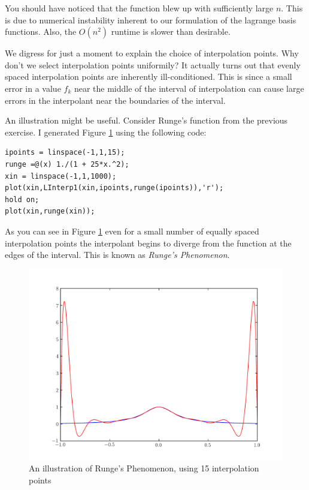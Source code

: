 You should have noticed that the function blew up with sufficiently large $n$. This is due to numerical instability inherent to our formulation of the lagrange basis functions. Also, the $O(n^2)$ runtime is slower than desirable.

We digress for just a moment to explain the choice of interpolation points. Why don't we select interpolation points uniformily? It actually turns out that evenly spaced interpolation points are inherently ill-conditioned. This is since a small error in a value $f_k$ near the middle of the interval of interpolation can cause large errors in the interpolant near the boundaries of the interval.

An illustration might be useful. Consider Runge's function from the previous exercise. I generated Figure \ref{Fig:Runge} using the following code:

\begin{verbatim}
ipoints = linspace(-1,1,15);
runge =@(x) 1./(1 + 25*x.^2);
xin = linspace(-1,1,1000);
plot(xin,LInterp1(xin,ipoints,runge(ipoints)),'r');
hold on;
plot(xin,runge(xin));
\end{verbatim}

As you can see in Figure \ref{Fig:Runge} even for a small number of equally spaced interpolation points the interpolant begins to diverge from the function at the edges of the interval. This is known as \emph{Runge's Phenomenon}.

\begin{figure}
\begin{center}
\includegraphics[scale = .5]{./Figures/Runge.pdf}
\caption{An illustration of Runge's Phenomenon, using 15 interpolation points}
\label{Fig:Runge}
\end{center}
\end{figure}

